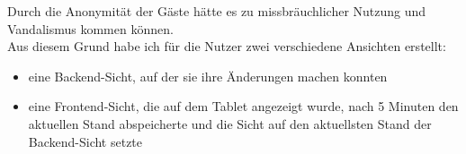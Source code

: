 Durch die Anonymität der Gäste hätte es zu missbräuchlicher Nutzung und Vandalismus kommen können.
\\
Aus diesem Grund habe ich für die Nutzer zwei verschiedene Ansichten erstellt:
\\
\begin{itemize}
  \item eine Backend-Sicht, auf der sie ihre Änderungen machen konnten
  \item eine Frontend-Sicht, die auf dem Tablet angezeigt wurde, nach 5 Minuten den aktuellen Stand abspeicherte und die Sicht auf den aktuellsten Stand der Backend-Sicht setzte
\end{itemize}

